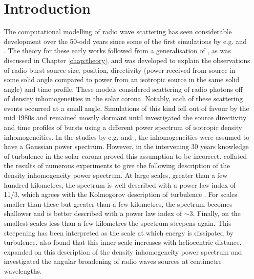 \section{Introduction}
\label{sec:obsvtheory_intro}
The computational modelling of radio wave scattering has seen considerable development over the 50-odd years since some of the first simulations by e.g. \cite{Fokker1965} and \cite{Steinberg1971}. The theory for these early works followed from a generalisation of \cite{Chandrasekhar1952}, as was discussed in Chapter \ref{chap:theory}, and was developed to explain the observations of radio burst source size, position, directivity (power received from source in some solid angle compared to power from an isotropic source in the same solid angle) and time profile. These models considered scattering of radio photons off of density inhomogeneities in the solar corona. Notably, each of these scattering events occurred at a small angle. Simulations of this kind fell out of favour by the mid 1980s and remained mostly dormant until \cite{Thejappa2007} investigated the source directivity and time profiles of bursts using a different power spectrum of isotropic density inhomogeneities. In the studies by e.g. \cite{Fokker1965} and \cite{Steinberg1971}, the inhomogeneities were assumed to have a Gaussian power spectrum. However, in the intervening 30 years knowledge of turbulence in the solar corona proved this assumption to be incorrect. \cite{Coles1989} collated the results of numerous experiments to give the following description of the density inhomogeneity power spectrum. At large scales, greater than a few hundred kilometres, the spectrum is well described with a power law index of 11/3, which agrees with the Kolmogorov description of turbulence \citep{Kolmogorov1941}. For scales smaller than these but greater than a few kilometres, the spectrum becomes shallower and is better described with a power law index of $\sim 3$. Finally, on the smallest scales less than a few kilometres the spectrum steepens again. This steepening has been interpreted as the scale at which energy is dissipated by turbulence. \cite{Coles1989} also found that this inner scale increases with heliocentric distance. \cite{Bastian1994} expanded on this description of the density inhomogeneity power spectrum and investigated the angular broadening of radio waves sources at centimetre wavelengths.

